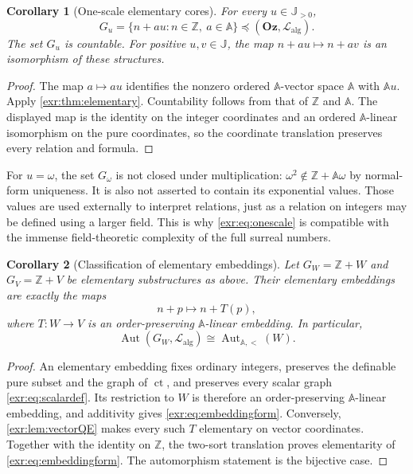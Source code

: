 \documentclass[11pt,letterpaper]{article}
\numberwithin{equation}{section}
\newtheorem{corollary}[corollary]{Corollary}
\theoremstyle{definition}
\theoremstyle{remark}
\newcommand{\Oz}{\mathbf{Oz}}
\newcommand{\Z}{\mathbb Z}
\newcommand{\A}{\mathbb A}
\newcommand{\J}{\mathbb J}
\newcommand{\Lalg}{\mathcal L_{\mathrm{alg}}}
\newcommand{\ct}{\operatorname{ct}}
\newcommand{\Aut}{\operatorname{Aut}}
\begin{document}
\begin{corollary}[One-scale elementary cores]\label{exr:cor:onescale}
For every $u\in\J_{>0}$,
\begin{equation}\label{exr:eq:onescale}
 G_u=\{n+a u:n\in\Z,\ a\in\A\}
 \preccurlyeq(\Oz,\Lalg).
\end{equation}
The set $G_u$ is countable. For positive $u,v\in\J$, the map
$n+a u\mapsto n+a v$ is an isomorphism of these structures.
\end{corollary}
\begin{proof}
The map $a\mapsto a u$ identifies the nonzero ordered $\A$-vector space $\A$ with
$\A u$. Apply \cref{exr:thm:elementary}. Countability follows from that of $\Z$ and
$\A$. The displayed map is the identity on the integer coordinates and an ordered
$\A$-linear isomorphism on the pure coordinates, so the coordinate translation
preserves every relation and formula.
\end{proof}

For $u=\omega$, the set $G_\omega$ is not closed under multiplication:
$\omega^2\notin\Z+\A\omega$ by normal-form uniqueness. It is also not asserted to
contain its exponential values. Those values are used externally to interpret
relations, just as a relation on integers may be defined using a larger field.
This is why \eqref{exr:eq:onescale} is compatible with the immense field-theoretic
complexity of the full surreal numbers.

\begin{corollary}[Classification of elementary embeddings]\label{exr:cor:embeddings}
Let $G_W=\Z+W$ and $G_V=\Z+V$ be elementary substructures as above. Their elementary
embeddings are exactly the maps
\begin{equation}\label{exr:eq:embeddingform}
 n+p\longmapsto n+T(p),
\end{equation}
where $T:W\to V$ is an order-preserving $\A$-linear embedding. In particular,
\begin{equation}
 \Aut(G_W,\Lalg)\cong\Aut_{\A,<}(W).
\end{equation}
\end{corollary}
\begin{proof}
An elementary embedding fixes ordinary integers, preserves the definable pure
subset and the graph of $\ct$, and preserves every scalar graph
\eqref{exr:eq:scalardef}. Its restriction to $W$ is therefore an order-preserving
$\A$-linear embedding, and additivity gives \eqref{exr:eq:embeddingform}. Conversely,
\cref{exr:lem:vectorQE} makes every such $T$ elementary on vector coordinates.
Together with the identity on $\Z$, the two-sort translation proves elementarity
of \eqref{exr:eq:embeddingform}. The automorphism statement is the bijective case.
\end{proof}
\end{document}
